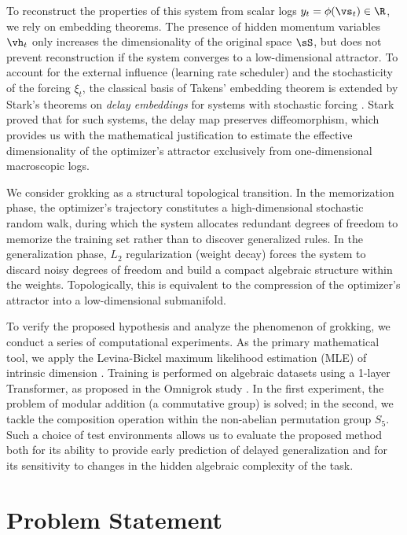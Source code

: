 \documentclass{article}
\begin{document}
To reconstruct the properties of this system from scalar logs $y_t = \phi(\vs_t) \in \R$, we rely on embedding theorems. The presence of hidden momentum variables $\vh_t$ only increases the dimensionality of the original space $\sS$, but does not prevent reconstruction if the system converges to a low-dimensional attractor. To account for the external influence (learning rate scheduler) and the stochasticity of the forcing $\xi_t$, the classical basis of Takens' embedding theorem \cite{takens1981detecting} is extended by Stark's theorems on \textit{delay embeddings} for systems with stochastic forcing \cite{stark1999delay, stark2003delay}. Stark proved that for such systems, the delay map preserves diffeomorphism, which provides us with the mathematical justification to estimate the effective dimensionality of the optimizer's attractor exclusively from one-dimensional macroscopic logs.

We consider grokking as a structural topological transition. In the memorization phase, the optimizer's trajectory constitutes a high-dimensional stochastic random walk, during which the system allocates redundant degrees of freedom to memorize the training set rather than to discover generalized rules. In the generalization phase, $L_2$ regularization (weight decay) forces the system to discard noisy degrees of freedom and build a compact algebraic structure within the weights. Topologically, this is equivalent to the compression of the optimizer's attractor into a low-dimensional submanifold.

To verify the proposed hypothesis and analyze the phenomenon of grokking, we conduct a series of computational experiments. As the primary mathematical tool, we apply the Levina-Bickel maximum likelihood estimation (MLE) of intrinsic dimension \cite{levina2004maximum}. Training is performed on algebraic datasets using a 1-layer Transformer, as proposed in the Omnigrok study \cite{liu2022omnigrok}. In the first experiment, the problem of modular addition (a commutative group) is solved; in the second, we tackle the composition operation within the non-abelian permutation group $S_5$. Such a choice of test environments allows us to evaluate the proposed method both for its ability to provide early prediction of delayed generalization and for its sensitivity to changes in the hidden algebraic complexity of the task.






\section{Problem Statement}\label{sec:problem}
\end{document}
